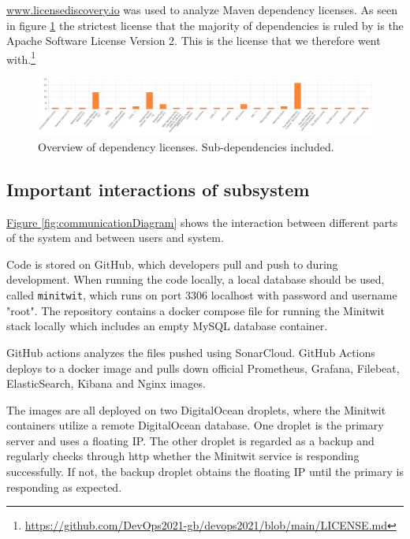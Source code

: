 \url{www.licensediscovery.io} was used to analyze Maven dependency licenses. As seen in figure \ref{fig:licenceDep} the strictest license that the majority of dependencies is ruled by is the Apache Software License Version 2. This is the license that we therefore went with.\footnote{\url{https://github.com/DevOps2021-gb/devops2021/blob/main/LICENSE.md}} 
\begin{figure}[!htb]
    \centering
    \includegraphics[scale=0.2]{images/LicenceDependencies.png}
    \caption{Overview of dependency licenses. Sub-dependencies included.}
    \label{fig:licenceDep}
\end{figure}

\subsection{Important interactions of subsystem}
\hyperref[fig:componentDiagram]{Figure \ref{fig:communicationDiagram}} shows the interaction between different parts of the system and between users and system.

Code is stored on GitHub, which developers pull and push to during development. When running the code locally, a local database should be used, called \texttt{minitwit}, which runs on port 3306 localhost with password and username "root". The repository contains a docker compose file for running the Minitwit stack locally which includes an empty MySQL database container.

GitHub actions analyzes the files pushed using SonarCloud. GitHub Actions deploys to a docker image and pulls down official Prometheus, Grafana, Filebeat, ElasticSearch, Kibana and Nginx images.

The images are all deployed on two DigitalOcean droplets, where the Minitwit containers utilize a remote DigitalOcean database. One droplet is the primary server and uses a floating IP. The other droplet is regarded as a backup and regularly checks through http whether the Minitwit service is responding successfully. If not, the backup droplet obtains the floating IP until the primary is responding as expected.

